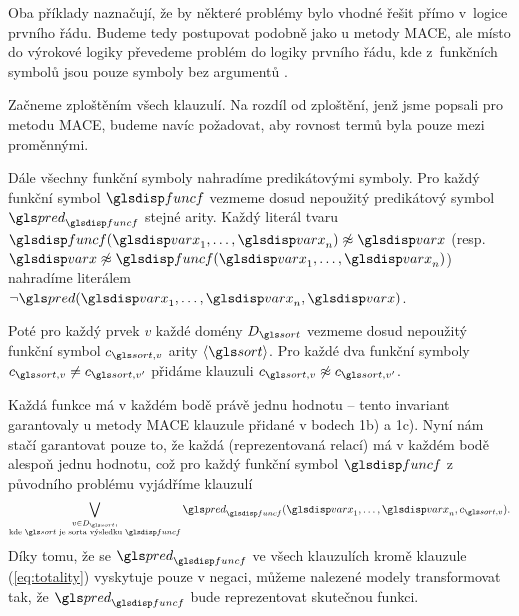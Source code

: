 Oba příklady naznačují, že by některé problémy bylo vhodné řešit
přímo v~logice prvního řádu. Budeme tedy postupovat podobně
jako u metody MACE, ale místo do výrokové logiky převedeme
problém do logiky prvního řádu, kde z~funkčních symbolů
jsou pouze symboly bez argumentů \cite{fmdarwin}.

Začneme zploštěním všech klauzulí. Na rozdíl od zploštění,
jenž jsme popsali pro metodu MACE, budeme navíc požadovat, aby
rovnost termů byla pouze mezi proměnnými.

Dále všechny funkční symboly nahradíme predikátovými symboly.
Pro každý funkční symbol $\func$
vezmeme dosud nepoužitý predikátový symbol
$\pred_\func$ stejné arity. Každý literál tvaru
$\func(\var_1 \comdots \var_n) \not\approx \var$
(resp. $\var \not\approx \func(\var_1 \comdots \var_n)$)
nahradíme literálem $\neg \pred(\var_1 \comdots \var_n, \var)$.


Poté pro každý prvek $v$ každé domény $D_\sort$ vezmeme
dosud nepoužitý funkční symbol $c_{\sort, v}$ arity $\langle \sort \rangle$.
Pro každé dva funkční symboly $c_{\sort, v} \neq c_{\sort, v'}$
přidáme klauzuli $c_{\sort, v} \not\approx c_{\sort, v'}$.


Každá funkce má v každém bodě právě jednu hodnotu -- tento
invariant garantovaly u metody MACE klauzule přidané v bodech 1b) a 1c).
Nyní nám stačí garantovat pouze to, že každá 
(reprezentovaná relací) má v každém bodě alespoň jednu hodnotu,
což pro každý funkční symbol $\func$ z původního problému vyjádříme klauzulí
\begin{equation} \label{eq:totality}
  \bigvee_{\substack{v \in D_\sort, \\ \text{kde $\sort$ je sorta výsledku $\func$}}}
    \pred_\func(\var_1 \comdots \var_n, c_{\sort, v}).
\end{equation}
Díky tomu, že se $\pred_\func$ ve všech klauzulích kromě
klauzule (\ref{eq:totality}) vyskytuje pouze v negaci,
můžeme nalezené modely transformovat tak, že $\pred_\func$
bude reprezentovat skutečnou funkci.


